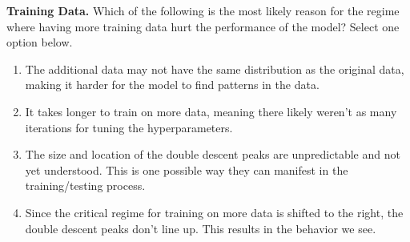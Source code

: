 \item{}
\textbf{Training Data.}
Which of the following is the most likely reason for the regime where having more training data hurt the performance of the model? Select one option below.

\begin{enumerate}[label=(\alph*)]
    \item The additional data may not have the same distribution as the original data, making it harder for the model to find patterns in the data.
    \item It takes longer to train on more data, meaning there likely weren’t as many iterations for tuning the hyperparameters.
    \item The size and location of the double descent peaks are unpredictable and not yet understood. This is one possible way they can manifest in the training/testing process.
    \item Since the critical regime for training on more data is shifted to the right, the double descent peaks don’t line up. This results in the behavior we see.
\end{enumerate} 
